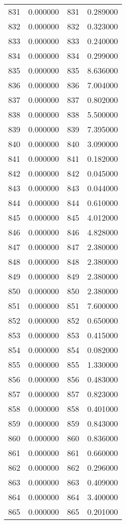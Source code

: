 \documentclass[12pt]{article}
\begin{document}
\begin{longtable}{@{}cccc@{}}
831 & 0.000000 & 831 & 0.289000 \\
832 & 0.000000 & 832 & 0.323000 \\
833 & 0.000000 & 833 & 0.240000 \\
834 & 0.000000 & 834 & 0.299000 \\
835 & 0.000000 & 835 & 8.636000 \\
836 & 0.000000 & 836 & 7.004000 \\
837 & 0.000000 & 837 & 0.802000 \\
838 & 0.000000 & 838 & 5.500000 \\
839 & 0.000000 & 839 & 7.395000 \\
840 & 0.000000 & 840 & 3.090000 \\
841 & 0.000000 & 841 & 0.182000 \\
842 & 0.000000 & 842 & 0.045000 \\
843 & 0.000000 & 843 & 0.044000 \\
844 & 0.000000 & 844 & 0.610000 \\
845 & 0.000000 & 845 & 4.012000 \\
846 & 0.000000 & 846 & 4.828000 \\
847 & 0.000000 & 847 & 2.380000 \\
848 & 0.000000 & 848 & 2.380000 \\
849 & 0.000000 & 849 & 2.380000 \\
850 & 0.000000 & 850 & 2.380000 \\
851 & 0.000000 & 851 & 7.600000 \\
852 & 0.000000 & 852 & 0.650000 \\
853 & 0.000000 & 853 & 0.415000 \\
854 & 0.000000 & 854 & 0.082000 \\
855 & 0.000000 & 855 & 1.330000 \\
856 & 0.000000 & 856 & 0.483000 \\
857 & 0.000000 & 857 & 0.823000 \\
858 & 0.000000 & 858 & 0.401000 \\
859 & 0.000000 & 859 & 0.843000 \\
860 & 0.000000 & 860 & 0.836000 \\
861 & 0.000000 & 861 & 0.660000 \\
862 & 0.000000 & 862 & 0.296000 \\
863 & 0.000000 & 863 & 0.409000 \\
864 & 0.000000 & 864 & 3.400000 \\
865 & 0.000000 & 865 & 0.201000 \\

\end{longtable}
\end{document}
